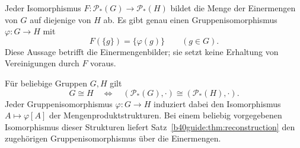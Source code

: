 \begin{theorem}
\label{b40guide:thm:reconstruction}
Jeder Isomorphismus \(F:\mathcal P_*(G)\to\mathcal P_*(H)\)
bildet die Menge der Einermengen von \(G\) auf diejenige von \(H\) ab.
Es gibt genau einen Gruppenisomorphismus \(\varphi:G\to H\) mit
\[
 F(\{g\})=\{\varphi(g)\}\qquad(g\in G).
\]
Diese Aussage betrifft die Einermengenbilder; sie setzt keine
Erhaltung von Vereinigungen durch \(F\) voraus.
\cite{projectreconstruction,liutringali}
\end{theorem}

\begin{theorem}
Für beliebige Gruppen \(G,H\) gilt
\[
 G\cong H
 \quad\Longleftrightarrow\quad
 (\mathcal P_*(G),\cdot)\cong(\mathcal P_*(H),\cdot).
\]
Jeder Gruppenisomorphismus \(\varphi:G\to H\) induziert dabei den
Isomorphismus \(A\mapsto\varphi[A]\) der Mengenproduktstrukturen.
Bei einem beliebig vorgegebenen Isomorphismus dieser Strukturen
liefert Satz~\ref{b40guide:thm:reconstruction} den zugehörigen
Gruppenisomorphismus über die Einermengen.
\cite{projectreconstruction,liutringali}
\end{theorem}
